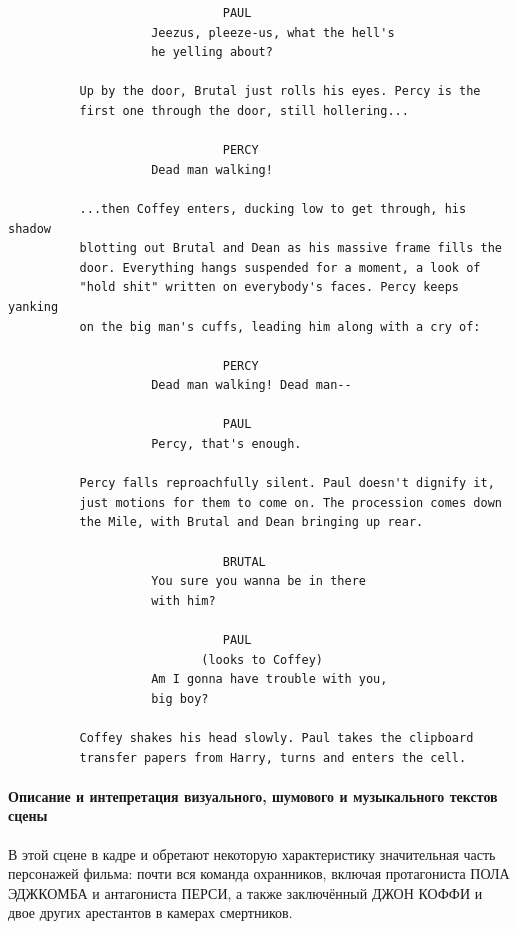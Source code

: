 \begin{verbatim}
                              PAUL
                    Jeezus, pleeze-us, what the hell's
                    he yelling about?

          Up by the door, Brutal just rolls his eyes. Percy is the
          first one through the door, still hollering...

                              PERCY
                    Dead man walking!

          ...then Coffey enters, ducking low to get through, his shadow
          blotting out Brutal and Dean as his massive frame fills the
          door. Everything hangs suspended for a moment, a look of
          "hold shit" written on everybody's faces. Percy keeps yanking
          on the big man's cuffs, leading him along with a cry of:

                              PERCY
                    Dead man walking! Dead man--

                              PAUL
                    Percy, that's enough.

          Percy falls reproachfully silent. Paul doesn't dignify it,
          just motions for them to come on. The procession comes down
          the Mile, with Brutal and Dean bringing up rear.

                              BRUTAL
                    You sure you wanna be in there
                    with him?

                              PAUL
                           (looks to Coffey)
                    Am I gonna have trouble with you,
                    big boy?

          Coffey shakes his head slowly. Paul takes the clipboard
          transfer papers from Harry, turns and enters the cell.
\end{verbatim}

\paragraph{Описание и интепретация визуального, шумового и музыкального текстов сцены}\label{ux43eux43fux438ux441ux430ux43dux438ux435-ux438-ux438ux43dux442ux435ux43fux440ux435ux442ux430ux446ux438ux44f-ux432ux438ux437ux443ux430ux43bux44cux43dux43eux433ux43e-ux448ux443ux43cux43eux432ux43eux433ux43e-ux438-ux43cux443ux437ux44bux43aux430ux43bux44cux43dux43eux433ux43e-ux442ux435ux43aux441ux442ux43eux432-ux441ux446ux435ux43dux44b}

В этой сцене в кадре и обретают некоторую характеристику значительная часть персонажей фильма: почти вся команда охранников, включая протагониста ПОЛА ЭДЖКОМБА и антагониста ПЕРСИ, а также заключённый ДЖОН КОФФИ и двое других арестантов в камерах смертников.

